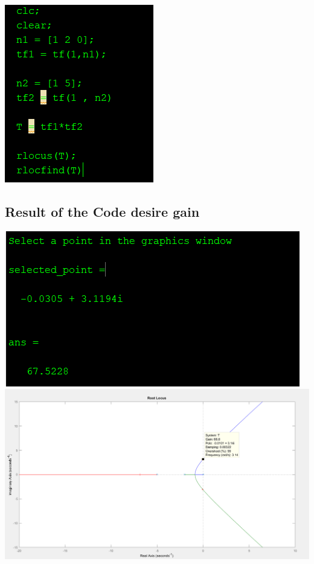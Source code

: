 \documentclass[12pt]{article}
\begin{document}
\includegraphics[scale=2]{../Lab12/Code1.png}\\ 

\subsection{Result of the Code desire gain} 

\includegraphics[scale=1]{../Lab12/ResultofK.png} \\
\includegraphics[scale=0.5]{../Lab12/Result1.png}\\
\end{document}
